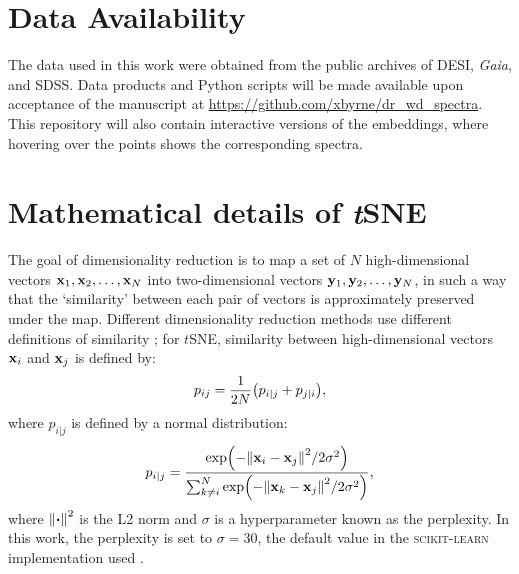 \documentclass[fleqn,usenatbib]{mnras}
\def\xb{\vb{x}}
\def\yb{\vb{y}}
\begin{document}
\section*{Data Availability}

The data used in this work were obtained from the public archives of DESI, \textit{Gaia}, and SDSS.
Data products and Python scripts will be made available upon acceptance of the manuscript at \url{https://github.com/xbyrne/dr_wd_spectra}.
This repository will also contain interactive versions of the embeddings, where hovering over the points shows the corresponding spectra. 









\appendix

\section{Mathematical details of \textit{t}SNE}
\label{sec:app}

The goal of dimensionality reduction is to map a set of $N$ high-dimensional vectors $\xb_1, \xb_2, \dots, \xb_N$ into two-dimensional vectors $\yb_1, \yb_2, \dots, \yb_N$, in such a way that the `similarity' between each pair of vectors is approximately preserved under the map.
Different dimensionality reduction methods use different definitions of similarity \citep{umap}; for $t$SNE, similarity between high-dimensional vectors $\xb_i$ and $\xb_j$ is defined by:
\begin{equation}
p_{ij}
= \frac{1}{2N} \qty(
    p_{i|j} + p_{j|i}
),
\end{equation}
where $p_{i|j}$ is defined by a normal distribution:
\begin{equation}
p_{i|j}
= \frac{
    \exp(-\norm{\xb_i - \xb_j}^2 / 2\sigma^2)
}{
    \sum_{k\neq i}^N
    \exp(-\norm{\xb_k - \xb_j}^2 / 2\sigma^2)
},
\end{equation}
where $\norm{\vdot}^2$ is the L2 norm and $\sigma$ is a hyperparameter known as the perplexity.
In this work, the perplexity is set to $\sigma=30$, the default value in the \textsc{scikit-learn} implementation used \citep{sklearn}.
\end{document}
